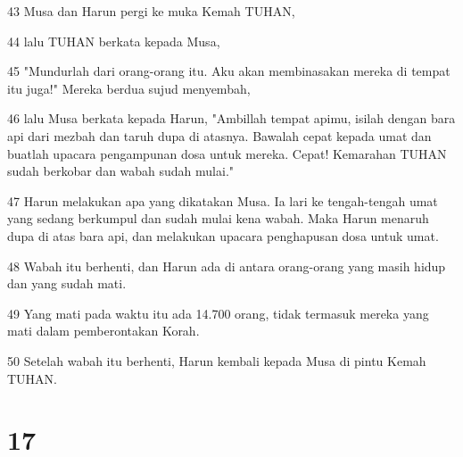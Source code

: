 \par 43 Musa dan Harun pergi ke muka Kemah TUHAN,
\par 44 lalu TUHAN berkata kepada Musa,
\par 45 "Mundurlah dari orang-orang itu. Aku akan membinasakan mereka di tempat itu juga!" Mereka berdua sujud menyembah,
\par 46 lalu Musa berkata kepada Harun, "Ambillah tempat apimu, isilah dengan bara api dari mezbah dan taruh dupa di atasnya. Bawalah cepat kepada umat dan buatlah upacara pengampunan dosa untuk mereka. Cepat! Kemarahan TUHAN sudah berkobar dan wabah sudah mulai."
\par 47 Harun melakukan apa yang dikatakan Musa. Ia lari ke tengah-tengah umat yang sedang berkumpul dan sudah mulai kena wabah. Maka Harun menaruh dupa di atas bara api, dan melakukan upacara penghapusan dosa untuk umat.
\par 48 Wabah itu berhenti, dan Harun ada di antara orang-orang yang masih hidup dan yang sudah mati.
\par 49 Yang mati pada waktu itu ada 14.700 orang, tidak termasuk mereka yang mati dalam pemberontakan Korah.
\par 50 Setelah wabah itu berhenti, Harun kembali kepada Musa di pintu Kemah TUHAN.

\chapter{17}

